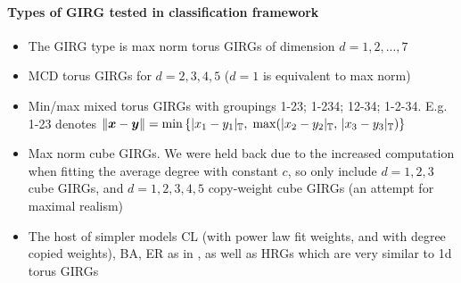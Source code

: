 

\paragraph{Types of GIRG tested in classification framework}
\begin{itemize}
    \item The  GIRG type is max norm torus GIRGs of dimension $d=1,2,...,7$
    \item MCD torus GIRGs for $d=2,3,4,5$ ($d=1$ is equivalent to max norm)
    \item Min/max mixed torus GIRGs with groupings 1-23; 1-234; 12-34; 1-2-34. E.g. 1-23 denotes $\left\lVert \bm{x} - \bm{y}\right\rVert = \min \left \{ |x_1 - y_1|_{\mathbb{T}},\; \max(|x_2 - y_2|_{\mathbb{T}},\, |x_3 - y_3|_{\mathbb{T}}) \right \}$
    \item Max norm cube GIRGs. We were held back due to the increased computation when fitting the average degree with constant $c$, so only include  $d=1,2,3$ cube GIRGs, and $d=1,2,3,4,5$ copy-weight cube GIRGs (an attempt for maximal realism)
    \item The host of simpler models CL (with power law fit weights, and with degree copied weights), BA, ER as in \cite{blasius2018towards}, as well as HRGs which are very similar to 1d torus GIRGs
\end{itemize}

